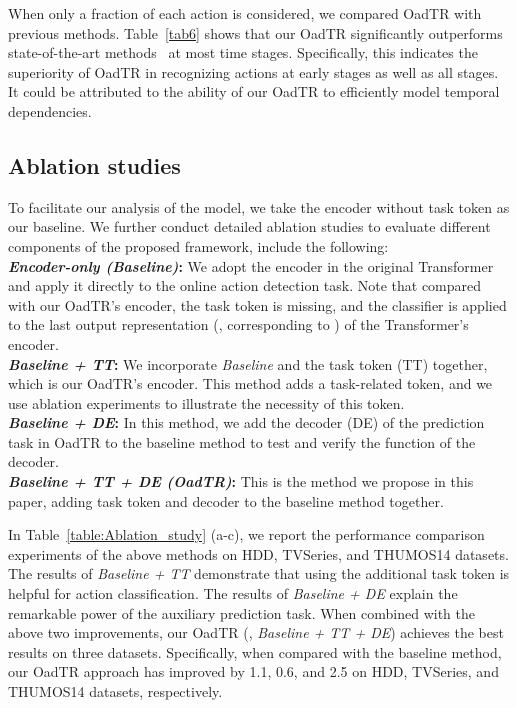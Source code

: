 \documentclass[10pt,twocolumn,letterpaper]{article}
\begin{document}
{When only a fraction of each action is considered, we compared OadTR with previous methods. Table~\ref{tab6} shows that our OadTR significantly outperforms state-of-the-art methods~\cite{TRN,IDN} at most time stages. Specifically, this indicates the superiority of OadTR in recognizing actions at early stages as well as all stages. It could be attributed to the ability of our OadTR to efficiently model temporal dependencies.

\subsection{Ablation studies}
\label{ablation}
To facilitate our analysis of the model, we take the encoder without task token as our baseline.
We further conduct detailed ablation studies to evaluate different components of the proposed framework, include the following:\\
\textbf{\textit{Encoder-only (Baseline)}:} We adopt the encoder in the original Transformer~\cite{Transformer} and apply it directly to the online action detection task. Note that compared with our OadTR's encoder, the task token is missing, and the classifier is applied to the last output representation (\ie, corresponding to ) of the Transformer's encoder.
\\
\textbf{\textit{Baseline + TT}:} We incorporate \textit{Baseline} and the task token (TT) together, which is our OadTR's encoder. This method adds a task-related token, and we use ablation experiments to illustrate the necessity of this token. \\
\textbf{\textit{Baseline + DE}:} In this method, we add the decoder (DE) of the prediction task in OadTR to the baseline method to test and verify the function of the decoder. \\
\textbf{\textit{Baseline + TT + DE (OadTR)}:} This is the method we propose in this paper, adding task token and decoder to the baseline method together. 

In Table~\ref{table:Ablation_study} (a-c), we report the performance comparison experiments of the above methods on HDD, TVSeries, and THUMOS14 datasets. The results of \textit{Baseline + TT} demonstrate that using the additional task token is helpful for action classification. The results of \textit{Baseline + DE} explain the remarkable power of the auxiliary prediction task. When combined with the above two improvements, our OadTR (\ie, \textit{Baseline + TT + DE}) achieves the best results on three datasets. Specifically, when compared with the baseline method, our OadTR approach has improved by 1.1, 0.6, and 2.5 on HDD, TVSeries, and THUMOS14 datasets, respectively. 
\vspace{+3pt} 

}
\end{document}
